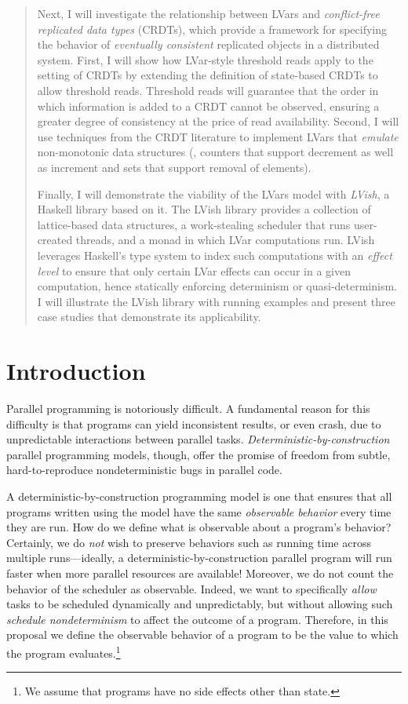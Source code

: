 \documentclass{article}
\begin{document}
\begin{abstract}
  Next, I will investigate the relationship between LVars and
  \emph{conflict-free replicated data types} (CRDTs), which provide a
  framework for specifying the behavior of \emph{eventually
    consistent} replicated objects in a distributed system.  First, I
  will show how LVar-style threshold reads apply to the setting of
  CRDTs by extending the definition of state-based CRDTs to allow
  threshold reads. Threshold reads will guarantee that the order in
  which information is added to a CRDT cannot be observed, ensuring a
  greater degree of consistency at the price of read availability.
  Second, I will use techniques from the CRDT literature to implement
  LVars that \emph{emulate} non-monotonic data structures (\ie,
  counters that support decrement as well as increment and sets that
  support removal of elements).

  Finally, I will demonstrate the viability of the LVars model with
  \emph{LVish}, a Haskell library based on it.  The LVish library
  provides a collection of lattice-based data structures, a
  work-stealing scheduler that runs user-created threads, and a monad
  in which LVar computations run.  LVish leverages Haskell's type
  system to index such computations with an \emph{effect level} to
  ensure that only certain LVar effects can occur in a given
  computation, hence statically enforcing determinism or
  quasi-determinism.  I will illustrate the LVish library with running
  examples and present three case studies that demonstrate its
  applicability.
\end{abstract}

\section{Introduction}\label{s:intro}

Parallel programming is notoriously difficult.  
A fundamental reason for this difficulty is that programs can yield
inconsistent results, or even crash, due to unpredictable interactions
between parallel tasks.  \emph{Deterministic-by-construction} parallel
programming models, though, offer the promise of freedom from subtle,
hard-to-reproduce nondeterministic bugs in parallel code.

A deterministic-by-construction programming model is one that ensures
that all programs written using the model have the same
\emph{observable behavior} every time they are run.  How do we define
what is observable about a program's behavior?  Certainly, we do
\emph{not} wish to preserve behaviors such as running time across
multiple runs---ideally, a deterministic-by-construction parallel
program will run faster when more parallel resources are available!
Moreover, we do not count the behavior of the scheduler as observable.
Indeed, we want to specifically \emph{allow} tasks to be scheduled
dynamically and unpredictably, but without allowing such
\emph{schedule nondeterminism} to affect the outcome of a program.
Therefore, in this proposal we define the observable behavior of a
program to be the value to which the program evaluates.\footnote{We
  assume that programs have no side effects other than state.}
\end{document}
